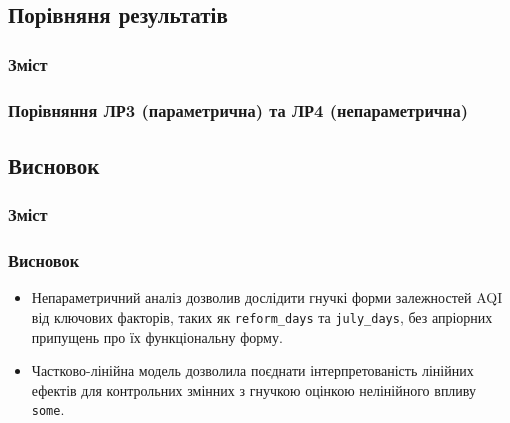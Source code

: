 ﻿\documentclass{beamer}
\begin{document}
\begin{frame}
  \section{Порівняня результатів}

  \frametitle{Зміст}
  \tableofcontents[currentsection]
\end{frame}

\begin{frame}
  \frametitle{Порівняння ЛР3 (параметрична) та ЛР4 (непараметрична)}
  
\end{frame}

\begin{frame}
  \section{Висновок}

  \frametitle{Зміст}
  \tableofcontents[currentsection]
\end{frame}

\begin{frame}
  \frametitle{Висновок}

  \begin{itemize}
    \item Непараметричний аналіз дозволив дослідити гнучкі форми залежностей AQI від ключових факторів, таких як \texttt{reform\_days} та \texttt{july\_days}, без апріорних припущень про їх функціональну форму.
    \item Частково-лінійна модель дозволила поєднати інтерпретованість лінійних ефектів для контрольних змінних з гнучкою оцінкою нелінійного впливу \texttt{some}.
  \end{itemize}

\end{frame}
\end{document}
